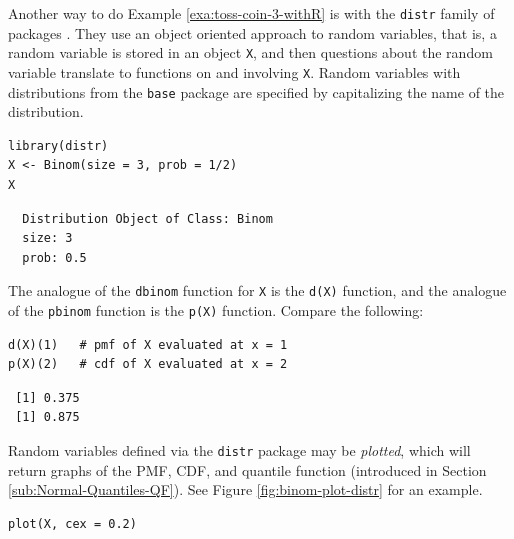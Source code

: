 \documentclass[captions=tableheading]{scrbook}
\begin{document}
\begin{example}
Another way to do Example \ref{exa:toss-coin-3-withR} is with the \texttt{distr} family of packages \cite{Ruckdescheldistr}. They use an object oriented approach to random variables, that is, a random variable is stored in an object \texttt{X}, and then questions about the random variable translate to functions on and involving \texttt{X}. Random variables with distributions from the \texttt{base} package are specified by capitalizing the name of the distribution.


\begin{verbatim}
library(distr)
X <- Binom(size = 3, prob = 1/2)
X
\end{verbatim}

\begin{verbatim}
  Distribution Object of Class: Binom
  size: 3
  prob: 0.5
\end{verbatim}

The analogue of the \texttt{dbinom} function for \texttt{X} is the \texttt{d(X)} function, and the analogue of the \texttt{pbinom} function is the \texttt{p(X)} function. Compare the following:


\begin{verbatim}
d(X)(1)   # pmf of X evaluated at x = 1
p(X)(2)   # cdf of X evaluated at x = 2
\end{verbatim}

\begin{verbatim}
 [1] 0.375
 [1] 0.875
\end{verbatim}

\end{example}

Random variables defined via the \texttt{distr} package may be \emph{plotted}, which will return graphs of the PMF, CDF, and quantile function (introduced in Section \ref{sub:Normal-Quantiles-QF}). See Figure \ref{fig:binom-plot-distr} for an example.



\begin{verbatim}
plot(X, cex = 0.2)
\end{verbatim}
\end{document}

